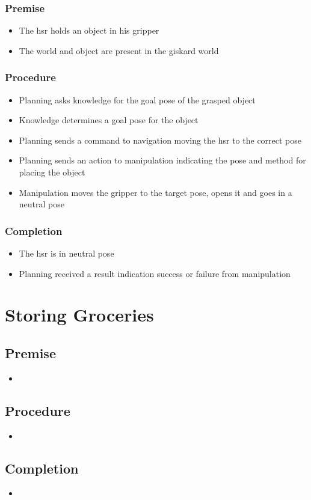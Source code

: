 \documentclass[main.tex]{subfiles}
\begin{document}
	\subsubsection{Premise}
	\begin{itemize}
		\item The hsr holds an object in his gripper
		\item The world and object are present in the giskard world
	\end{itemize} 
	
	\subsubsection{Procedure}
	\begin{itemize}			
		\item Planning asks knowledge for the goal pose of the grasped object
		\item Knowledge determines a goal pose for the object
		\item Planning sends a command to navigation moving the hsr to the correct pose
		\item Planning sends an action to manipulation indicating the pose and method for placing the object
		\item Manipulation moves the gripper to the target pose, opens it and goes in a neutral pose 				
	\end{itemize}
	
	\subsubsection{Completion}
	\begin{itemize}
		\item The hsr is in neutral pose
		\item Planning received a result indication success or failure from manipulation
				
	\end{itemize}
	
	\section{Storing Groceries}
	
	\subsection{Premise}
		\begin{itemize}
			\item 
		\end{itemize} 
		
	\subsection{Procedure}
		\begin{itemize}			
			\item 						
		\end{itemize}
	
	\subsection{Completion}
		\begin{itemize}
			\item 	
		\end{itemize}
\end{document}
